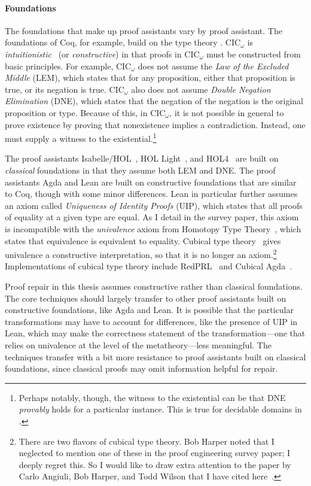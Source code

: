 \paragraph{Foundations}
The foundations that make up proof assistants vary by proof assistant.
The foundations of Coq, for example, build on the type theory .
CIC$_{\omega}$ is \textit{intuitionistic}~\cite{Heyting1956} (or \textit{constructive}) in that
proofs in CIC$_{\omega}$ must be constructed from basic principles.
For example, CIC$_{\omega}$ does not assume the \textit{Law of the Excluded Middle} (LEM),
which states that for any proposition, either that proposition is true, or its negation is true.
CIC$_{\omega}$ also does not assume \textit{Double Negation Elimination} (DNE),
which states that the negation of the negation is the original proposition or type.
Because of this, in CIC$_{\omega}$, it is not possible in general to prove existence by proving that 
nonexistence implies a contradiction.
Instead, one must supply a witness to the existential.\footnote{Perhaps notably, though, the witness to the existential can be that 
DNE \emph{provably} holds for a particular instance. This is true for decidable domains in .} 

The proof assistants Isabelle/HOL~\cite{isabelle}, HOL Light~\cite{hollight}, and HOL4~\cite{hol4-interact} are built on \textit{classical} foundations
in that they assume both LEM and DNE.
The proof assistants Agda and Lean are built on constructive foundations that are similar to Coq, though with some minor differences.
Lean in particular further assumes an axiom called \textit{Uniqueness of Identity Proofs} (UIP), which states that all proofs of
equality at a given type are equal.
As I detail in the survey paper, this axiom is incompatible with the \textit{univalence} axiom from Homotopy Type Theory~\cite{univalent2013homotopy},
which states that equivalence is equivalent to equality.
Cubical type theory~\cite{cohen2016cubical, angiuli2017cubical} gives univalence a constructive interpretation,
so that it is no longer an axiom.\footnote{There are two flavors of cubical type theory.
Bob Harper noted that I neglected to mention one of these in the proof engineering survey paper; I deeply regret this.
So I would like to draw extra attention to the paper by Carlo Angiuli, Bob Harper, and Todd Wilson that I have cited here~\cite{angiuli2017cubical}.}
Implementations of cubical type theory include RedPRL~\cite{redprl} and Cubical Agda~\cite{cubical-agda}.

Proof repair in this thesis assumes constructive rather than classical foundations.
The core techniques should largely transfer to other proof assistants built on constructive foundations, like Agda and Lean.
It is possible that the particular transformations may have to account for differences, like the presence of UIP in Lean,
which may make the correctness statement of the \toolnamec transformation---one that relies on univalence at the level of the metatheory---less meaningful.
The techniques transfer with a bit more resistance to proof assistants built on classical foundations,
since classical proofs may omit information helpful for repair.

